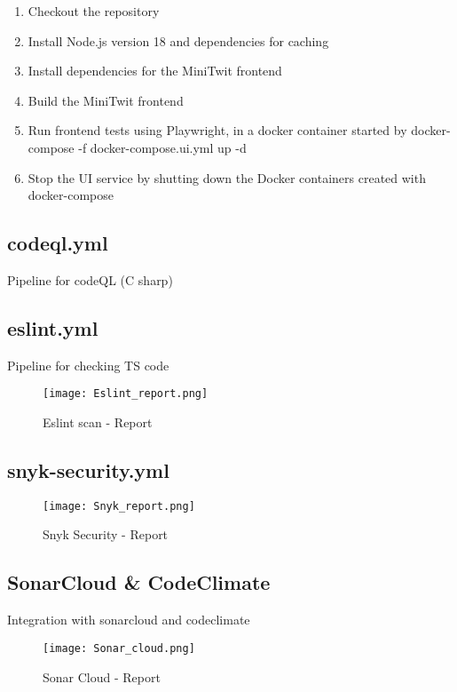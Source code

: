 \begin{enumerate}
    \item Checkout the repository
    \item Install Node.js version 18 and dependencies for caching
    \item Install dependencies for the MiniTwit frontend
    \item Build the MiniTwit frontend
    \item Run frontend tests using Playwright, in a docker container started by docker-compose -f docker-compose.ui.yml up -d
    \item Stop the UI service by shutting down the Docker containers created with docker-compose
\end{enumerate}

\subsection{codeql.yml}
Pipeline for codeQL (C sharp) 

\subsection{eslint.yml}
Pipeline for checking TS code

\begin{figure}[H]
    \centering
    \texttt{[image: Eslint\_report.png]}
    \caption{Eslint scan - Report}
    \label{fig:my_label}
\end{figure}

\subsection{snyk-security.yml}

\begin{figure}[H]
    \centering
    \texttt{[image: Snyk\_report.png]}
    \caption{Snyk Security - Report}
    \label{fig:my_label}
\end{figure}

\subsection{SonarCloud \& CodeClimate}
Integration with sonarcloud and codeclimate

\begin{figure}[H]
    \centering
    \texttt{[image: Sonar\_cloud.png]}
    \caption{Sonar Cloud - Report}
    \label{fig:my_label}
\end{figure}

